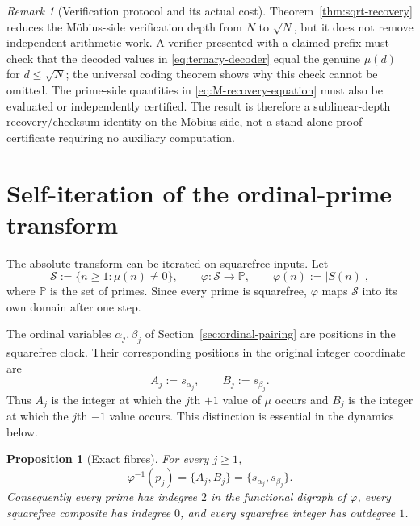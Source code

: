 \documentclass[11pt]{amsart}
\numberwithin{equation}{section}
\theoremstyle{plain}
\newtheorem{proposition}[theorem]{Proposition}
\theoremstyle{definition}
\theoremstyle{remark}
\newtheorem{remark}[theorem]{Remark}
\begin{document}
\begin{remark}[Verification protocol and its actual cost]
\label{rem:sqrt-verification}
Theorem~\ref{thm:sqrt-recovery} reduces the M\"obius-side verification depth
from $N$ to $\sqrt N$, but it does not remove independent arithmetic work.
A verifier presented with a claimed prefix must check that the decoded values
in \eqref{eq:ternary-decoder} equal the genuine $\mu(d)$ for
$d\le\sqrt N$; the universal coding theorem shows why this check cannot be
omitted.  The prime-side quantities in \eqref{eq:M-recovery-equation} must also
be evaluated or independently certified.  The result is therefore a
sublinear-depth recovery/checksum identity on the M\"obius side, not a
stand-alone proof certificate requiring no auxiliary computation.
\end{remark}

\section{Self-iteration of the ordinal-prime transform}
\label{sec:self-dynamics}

The absolute transform can be iterated on squarefree inputs.  Let
\begin{equation}
\label{eq:phi-definition}
\mathcal S:=\{n\ge1:\mu(n)\ne0\},
\qquad
\varphi:\mathcal S\to\mathbb P,
\qquad
\varphi(n):=|S(n)|,
\end{equation}
where $\mathbb P$ is the set of primes.  Since every prime is squarefree,
$\varphi$ maps $\mathcal S$ into its own domain after one step.

The ordinal variables $\alpha_j,\beta_j$ of Section~\ref{sec:ordinal-pairing}
are positions in the squarefree clock.  Their corresponding positions in the
original integer coordinate are
\begin{equation}
\label{eq:integer-occurrence-positions}
A_j:=s_{\alpha_j},
\qquad
B_j:=s_{\beta_j}.
\end{equation}
Thus $A_j$ is the integer at which the $j$th $+1$ value of $\mu$ occurs and
$B_j$ is the integer at which the $j$th $-1$ value occurs.  This distinction is
essential in the dynamics below.

\begin{proposition}[Exact fibres]
\label{prop:phi-fibres}
For every $j\ge1$,
\begin{equation}
\label{eq:phi-fibres}
\boxed{\;\varphi^{-1}(p_j)=\{A_j,B_j\}
      =\{s_{\alpha_j},s_{\beta_j}\}.\;}
\end{equation}
Consequently every prime has indegree $2$ in the functional digraph of
$\varphi$, every squarefree composite has indegree $0$, and every squarefree
integer has outdegree $1$.
\end{proposition}
\end{document}
